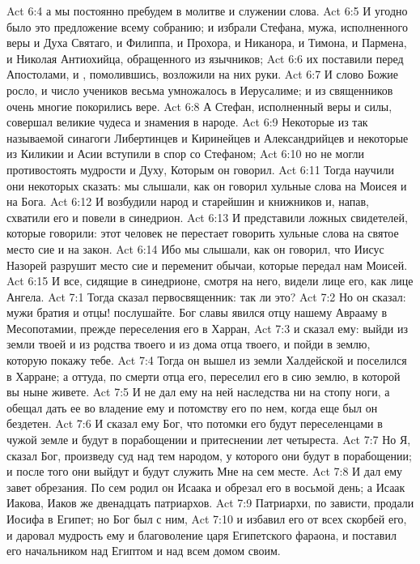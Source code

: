 \vs Act 6:4 а мы постоянно пребудем в молитве и служении слова.
\vs Act 6:5 И угодно было это предложение всему собранию; и избрали Стефана, мужа, исполненного веры и Духа Святаго, и Филиппа, и Прохора, и Никанора, и Тимона, и Пармена, и Николая Антиохийца, обращенного из язычников;
\vs Act 6:6 их поставили перед Апостолами, и , помолившись, возложили на них руки.
\rsbpar\vs Act 6:7 И слово Божие росло, и число учеников весьма умножалось в Иерусалиме; и из священников очень многие покорились вере.
\rsbpar\vs Act 6:8 А Стефан, исполненный веры и силы, совершал великие чудеса и знамения в народе.
\vs Act 6:9 Некоторые из так называемой синагоги Либертинцев и Киринейцев и Александрийцев и некоторые из Киликии и Асии вступили в спор со Стефаном;
\vs Act 6:10 но не могли противостоять мудрости и Духу, Которым он говорил.
\vs Act 6:11 Тогда научили они некоторых сказать: мы слышали, как он говорил хульные слова на Моисея и на Бога.
\vs Act 6:12 И возбудили народ и старейшин и книжников и, напав, схватили его и повели в синедрион.
\vs Act 6:13 И представили ложных свидетелей, которые говорили: этот человек не перестает говорить хульные слова на святое место сие и на закон.
\vs Act 6:14 Ибо мы слышали, как он говорил, что Иисус Назорей разрушит место сие и переменит обычаи, которые передал нам Моисей.
\vs Act 6:15 И все, сидящие в синедрионе, смотря на него, видели лице его, как лице Ангела.
\vs Act 7:1 Тогда сказал первосвященник: так ли это?
\vs Act 7:2 Но он сказал: мужи братия и отцы! послушайте. Бог славы явился отцу нашему Аврааму в Месопотамии, прежде переселения его в Харран,
\vs Act 7:3 и сказал ему: выйди из земли твоей и из родства твоего и из дома отца твоего, и пойди в землю, которую покажу тебе.
\vs Act 7:4 Тогда он вышел из земли Халдейской и поселился в Харране; а оттуда, по смерти отца его, переселил его  в сию землю, в которой вы ныне живете.
\vs Act 7:5 И не дал ему на ней наследства ни на стопу ноги, а обещал дать ее во владение ему и потомству его по нем, когда еще был он бездетен.
\vs Act 7:6 И сказал ему Бог, что потомки его будут переселенцами в чужой земле и будут в порабощении и притеснении лет четыреста.
\vs Act 7:7 Но Я, сказал Бог, произведу суд над тем народом, у которого они будут в порабощении; и после того они выйдут и будут служить Мне на сем месте.
\vs Act 7:8 И дал ему завет обрезания. По сем родил он Исаака и обрезал его в восьмой день; а Исаак  Иакова, Иаков же двенадцать патриархов.
\vs Act 7:9 Патриархи, по зависти, продали Иосифа в Египет; но Бог был с ним,
\vs Act 7:10 и избавил его от всех скорбей его, и даровал мудрость ему и благоволение царя Египетского фараона,  и поставил его начальником над Египтом и над всем домом своим.
